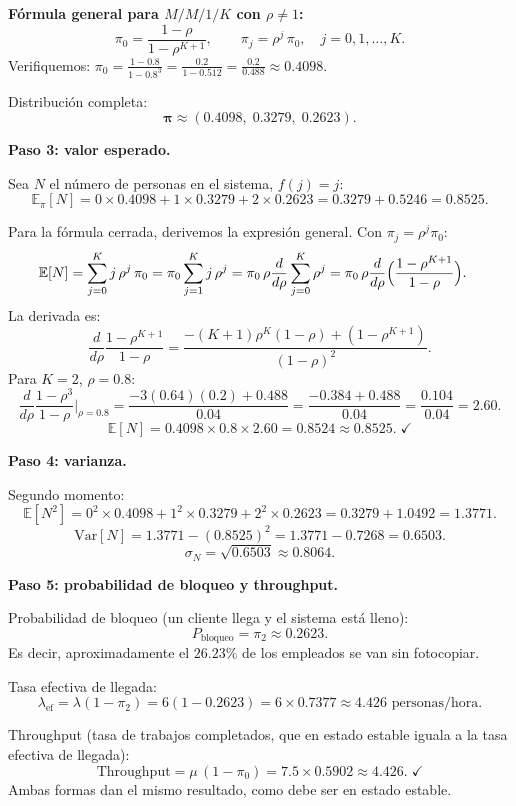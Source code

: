 \documentclass[11pt,a4paper]{article}
\theoremstyle{definition}
\theoremstyle{remark}
\newcommand{\E}{\mathbb{E}}
\newcommand{\Var}{\mathrm{Var}}
\begin{document}
\begin{ejemplo}
\textbf{Fórmula general para $M/M/1/K$ con $\rho\ne 1$:}
\[
  \pi_0 = \frac{1-\rho}{1-\rho^{K+1}}, \qquad
  \pi_j = \rho^j\,\pi_0, \quad j=0,1,\dots,K.
\]
Verifiquemos: $\pi_0 = \frac{1-0.8}{1-0.8^3} = \frac{0.2}{1-0.512}
= \frac{0.2}{0.488} \approx 0.4098$. \checkmark

Distribución completa:
\[
  \boldsymbol{\pi} \approx (0.4098,\; 0.3279,\; 0.2623).
\]

\textbf{Paso 3: valor esperado.}

Sea $N$ el número de personas en el sistema, $f(j)=j$:
\[
  \E_\pi[N] = 0\times 0.4098 + 1\times 0.3279 + 2\times 0.2623
  = 0.3279 + 0.5246 = 0.8525.
\]

Para la fórmula cerrada, derivemos la expresión general.  Con
$\pi_j = \rho^j\pi_0$:
\begin{align*}
  \E[N] &= \sum_{j=0}^{K} j\,\rho^j\,\pi_0
  = \pi_0\sum_{j=1}^{K}j\,\rho^j
  = \pi_0\,\rho\frac{d}{d\rho}\sum_{j=0}^{K}\rho^j
  = \pi_0\,\rho\frac{d}{d\rho}\Bigl(\frac{1-\rho^{K+1}}{1-\rho}\Bigr).
\end{align*}
La derivada es:
\[
  \frac{d}{d\rho}\frac{1-\rho^{K+1}}{1-\rho}
  = \frac{-(K+1)\rho^K(1-\rho)+(1-\rho^{K+1})}{(1-\rho)^2}.
\]
Para $K=2$, $\rho=0.8$:
\[
  \frac{d}{d\rho}\frac{1-\rho^3}{1-\rho}\Bigg|_{\rho=0.8}
  = \frac{-3(0.64)(0.2)+0.488}{0.04}
  = \frac{-0.384+0.488}{0.04}
  = \frac{0.104}{0.04} = 2.60.
\]
\[
  \E[N] = 0.4098 \times 0.8 \times 2.60 = 0.8524 \approx 0.8525. \;\checkmark
\]

\textbf{Paso 4: varianza.}

Segundo momento:
\[
  \E[N^2] = 0^2\times 0.4098 + 1^2\times 0.3279 + 2^2\times 0.2623
  = 0.3279 + 1.0492 = 1.3771.
\]
\[
  \Var[N] = 1.3771 - (0.8525)^2 = 1.3771 - 0.7268 = 0.6503.
\]
\[
  \sigma_N = \sqrt{0.6503} \approx 0.8064.
\]

\textbf{Paso 5: probabilidad de bloqueo y throughput.}

Probabilidad de bloqueo (un cliente llega y el sistema está lleno):
\[
  P_{\text{bloqueo}} = \pi_2 \approx 0.2623.
\]
Es decir, aproximadamente el $26.23\%$ de los empleados se van sin
fotocopiar.

Tasa efectiva de llegada:
\[
  \lambda_{\text{ef}} = \lambda(1-\pi_2) = 6(1-0.2623) = 6\times 0.7377
  \approx 4.426 \text{ personas/hora}.
\]

Throughput (tasa de trabajos completados, que en estado estable iguala
a la tasa efectiva de llegada):
\[
  \text{Throughput} = \mu\,(1-\pi_0) = 7.5\times 0.5902 \approx 4.426. \;\checkmark
\]
Ambas formas dan el mismo resultado, como debe ser en estado estable.
\end{ejemplo}
\end{document}
